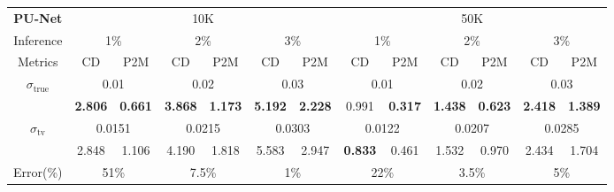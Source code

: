 \begin{tabular}{ccccccc|cccccc}
    \toprule
    \bf PU-Net & \multicolumn{6}{c|}{10K} & \multicolumn{6}{c}{50K}  \\
    Inference  &\multicolumn{2}{c}{1\%}   &\multicolumn{2}{c}{2\%} &\multicolumn{2}{c|}{3\%} 
              &\multicolumn{2}{c}{1\%}   &\multicolumn{2}{c}{2\%} &\multicolumn{2}{c}{3\%}   \\  \midrule
    \multicolumn{1}{c|}{Metrics}  & CD & P2M   & CD  & P2M   & CD & P2M   & CD & P2M   & CD& P2M    & CD& P2M        \\
    \midrule
    \multicolumn{1}{c|}{\multirow{2}{*}{$\sigma_\text{true}$}}
    &\multicolumn{2}{c}{0.01} &\multicolumn{2}{c}{0.02}    &\multicolumn{2}{c|}{0.03}  
    &\multicolumn{2}{c}{0.01} &\multicolumn{2}{c}{0.02}    &\multicolumn{2}{c}{0.03} \\
    \multicolumn{1}{c|}{} 
    & \bf2.806   & \bf0.661      & \bf3.868  & \bf1.173    & \bf5.192 & \bf2.228   
    & 0.991 & \bf0.317        & \bf1.438  & \bf0.623       & \bf2.418  & \bf1.389 \\
    \midrule
    \multicolumn{1}{c|}{\multirow{2}{*}{$\sigma_\text{tv}$}} 
    
    &\multicolumn{2}{c}{0.0151}  &\multicolumn{2}{c}{0.0215}  &\multicolumn{2}{c|}{0.0303}     
    &\multicolumn{2}{c}{0.0122} &\multicolumn{2}{c}{0.0207}  &\multicolumn{2}{c}{0.0285}  \\
    \multicolumn{1}{c|}{} 
    & 2.848  & 1.106           & 4.190   & 1.818         & 5.583   & 2.947           
    & \bf0.833   & 0.461          & 1.532  & 0.970          & 2.434   & 1.704  \\
    \midrule
    \multicolumn{1}{c|}{Error(\%)}  &\multicolumn{2}{c}{51\%}  &\multicolumn{2}{c}{7.5\%} &\multicolumn{2}{c|}{1\%}   
    &\multicolumn{2}{c}{22\%}  &\multicolumn{2}{c}{3.5\%} &\multicolumn{2}{c}{5\%}     \\ 
\bottomrule
\end{tabular}
